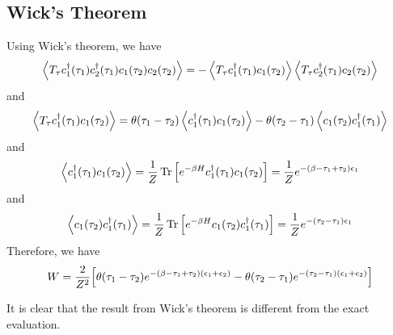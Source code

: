 \documentclass{article}
\begin{document}
\subsection*{Wick's Theorem}
Using Wick's theorem, we have
\begin{equation}
    \expval{T_\tau c_1^\dagger(\tau_1) c_2^\dagger(\tau_1)c_1(\tau_2)c_2(\tau_2)}=-\expval{T_\tau c_1^\dagger(\tau_1)c_1(\tau_2)}\expval{T_\tau c_2^\dagger(\tau_1)c_2(\tau_2)}
\end{equation}
and 
\begin{equation}
    \expval{T_\tau c_1^\dagger(\tau_1)c_1(\tau_2)}=\theta(\tau_1-\tau_2)\expval{c_1^\dagger(\tau_1)c_1(\tau_2)}-\theta(\tau_2-\tau_1)\expval{c_1(\tau_2)c_1^\dagger(\tau_1)}
\end{equation}
and 
\begin{equation}
    \expval{c_1^\dagger(\tau_1)c_1(\tau_2)}=\frac{1}{Z}\Tr\qty[e^{-\beta H}c_1^\dagger(\tau_1)c_1(\tau_2)]=\frac{1}{Z}e^{-(\beta-\tau_1+\tau_2)\epsilon_1}
\end{equation}
and 
\begin{equation}
    \expval{c_1(\tau_2)c_1^\dagger(\tau_1)}=\frac{1}{Z}\Tr\qty[e^{-\beta H}c_1(\tau_2)c_1^\dagger(\tau_1)]=\frac{1}{Z}e^{-(\tau_2-\tau_1)\epsilon_1}
\end{equation}
Therefore, we have 
\begin{equation}
    W=\frac{2}{Z^2}\qty[\theta(\tau_1-\tau_2)e^{-(\beta-\tau_1+\tau_2) (\epsilon_1+\epsilon_2)}-\theta(\tau_2-\tau_1)e^{-(\tau_2-\tau_1) (\epsilon_1+\epsilon_2)}]
\end{equation}

It is clear that the result from Wick's theorem is different from the exact evaluation.


%
%
\end{document}
